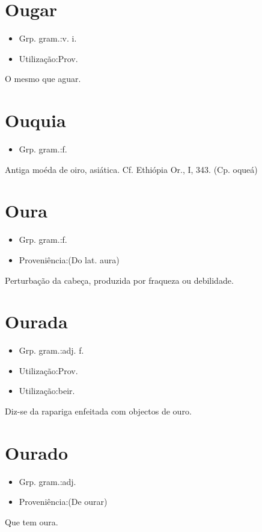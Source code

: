 \section{Ougar}
\begin{itemize}
\item {Grp. gram.:v. i.}
\end{itemize}
\begin{itemize}
\item {Utilização:Prov.}
\end{itemize}
O mesmo que \textunderscore aguar\textunderscore .
\section{Ouquia}
\begin{itemize}
\item {Grp. gram.:f.}
\end{itemize}
Antiga moéda de oiro, asiática. Cf. \textunderscore Ethiópia Or.\textunderscore , I, 343.
(Cp. \textunderscore oqueá\textunderscore )
\section{Oura}
\begin{itemize}
\item {Grp. gram.:f.}
\end{itemize}
\begin{itemize}
\item {Proveniência:(Do lat. \textunderscore aura\textunderscore )}
\end{itemize}
Perturbação da cabeça, produzida por fraqueza ou debilidade.
\section{Ourada}
\begin{itemize}
\item {Grp. gram.:adj. f.}
\end{itemize}
\begin{itemize}
\item {Utilização:Prov.}
\end{itemize}
\begin{itemize}
\item {Utilização:beir.}
\end{itemize}
Diz-se da rapariga enfeitada com objectos de ouro.
\section{Ourado}
\begin{itemize}
\item {Grp. gram.:adj.}
\end{itemize}
\begin{itemize}
\item {Proveniência:(De \textunderscore ourar\textunderscore )}
\end{itemize}
Que tem oura.
